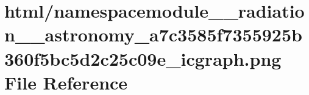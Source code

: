 \hypertarget{namespacemodule____radiation____astronomy__a7c3585f7355925b360f5bc5d2c25c09e__icgraph_8png}{}\section{html/namespacemodule\+\_\+\+\_\+radiation\+\_\+\+\_\+astronomy\+\_\+a7c3585f7355925b360f5bc5d2c25c09e\+\_\+icgraph.png File Reference}
\label{namespacemodule____radiation____astronomy__a7c3585f7355925b360f5bc5d2c25c09e__icgraph_8png}
